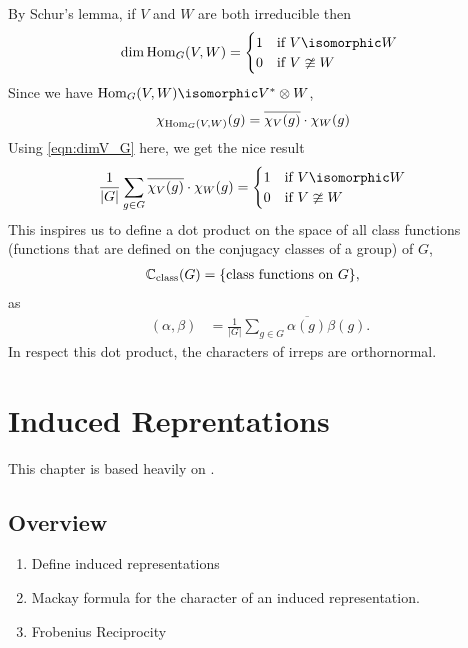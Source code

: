 By Schur's lemma, if $V$ and $W$ are both irreducible then
\begin{equation}
    \dim \Hom_G(V,W) = 
        \begin{cases}    
            1   &\text{if } V\isomorphic W \\
            0   &\text{if } V\ncong  W
        \end{cases}
\end{equation}
Since we have $\Hom_G(V,W)\isomorphic V^*\otimes W$,
\begin{align}
    \chi_{\operatorname{Hom}_G(V,W)}(g) &= \overline{\chi_V(g)}\cdot\chi_W(g)
\end{align}
Using \eqref{eqn:dimV_G} here, we get the nice result
\begin{align}
        \frac{1}{|G|}\sum_{g\in G} \overline{\chi_V(g)}\cdot\chi_W(g) 
        &= \begin{cases}    
            1   &\text{if } V\isomorphic W \\
            0   &\text{if } V\ncong  W
        \end{cases}
\end{align}
This inspires us to define a dot product on the space of all class functions (functions that are defined on the conjugacy classes of a group) of $G$,
\begin{align}
    \mathbb{C}_{\text{class}}(G) &= \{\text{class functions on $G$}\},
\end{align}
as
\begin{align}
    (\alpha,\beta) &= \frac{1}{|G|} \sum_{g\in G} \overline{\alpha(g)} \beta(g).
    \label{eqn:dotproduct_classfunctions}
\end{align}
In respect this dot product, the characters of irreps are orthornormal.

\chapter{Induced Reprentations}
\label{cha:induced_reprentations}

This chapter is based heavily on \cite{etingof_introduction_2009}.
\section{Overview}
\begin{enumerate}
    \makethislistcompact
    \item Define induced representations
    \item Mackay formula for the character of an induced representation.
    \item Frobenius Reciprocity
\end{enumerate}

